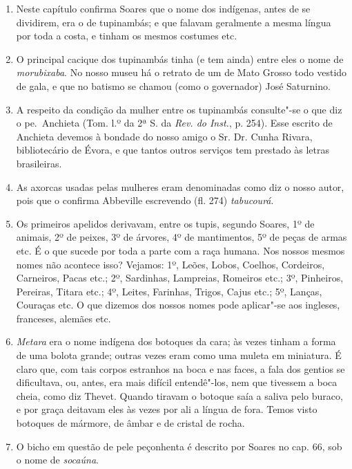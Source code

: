 \begin{enumerate}
\item Neste capítulo confirma Soares que o nome dos indígenas, antes de se dividirem, 
era o de tupinambás; e que falavam geralmente a mesma língua por toda a costa, e 
tinham os mesmos costumes etc.

\item O principal cacique dos tupinambás tinha (e tem ainda) entre eles o nome de 
\textit{morubixaba}. No nosso museu há o retrato de um de Mato Grosso todo vestido de gala, 
e que no batismo se chamou (como o governador) José Saturnino.

\item A respeito da condição da mulher entre os tupinambás consulte"-se o que diz o 
pe.~Anchieta (Tom. l.º da 2ª S. da \textit{Rev. do Inst.}, p. 254). Esse escrito de Anchieta devemos 
à bondade do nosso amigo o Sr. Dr. Cunha Rivara, bibliotecário de Évora, e que tantos 
outros serviços tem prestado às letras brasileiras.

\item As axorcas usadas pelas mulheres eram denominadas como diz o nosso autor, pois 
que o confirma Abbeville escrevendo (fl. 274) \textit{tabucourá}.

\item Os primeiros apelidos derivavam, entre os tupis, segundo Soares, 1º de animais, 2º 
de peixes, 3º de árvores, 4º de mantimentos, 5º de peças de armas etc.
É o que sucede por toda a parte com a raça humana. Nos nossos mesmos nomes não 
acontece isso? Vejamos: 1º, Leões, Lobos, Coelhos, Cordeiros, Carneiros, Pacas etc.; 2º, 
Sardinhas, Lampreias, Romeiros etc.; 3º, Pinheiros, Pereiras, Titara etc.; 4º, Leites, 
Farinhas, Trigos, Cajus etc.; 5º, Lanças, Couraças etc. O que dizemos dos nossos nomes 
pode aplicar"-se aos ingleses, franceses, alemães etc.

\item \textit{Metara} era o nome indígena dos botoques da cara; às vezes tinham a forma de uma 
bolota grande; outras vezes eram como uma muleta em miniatura. É claro que, com tais 
corpos estranhos na boca e nas faces, a fala dos gentios se dificultava, ou, antes, era 
mais difícil entendê"-los, nem que tivessem a boca cheia, como diz Thevet. Quando 
tiravam o botoque saía a saliva pelo buraco, e por graça deitavam eles às vezes por ali a 
língua de fora. Temos visto botoques de mármore, de âmbar e de cristal de rocha.

\item O bicho em questão de pele peçonhenta é descrito por Soares no cap. 66, sob o 
nome de \textit{socaúna}.


\end{enumerate}
